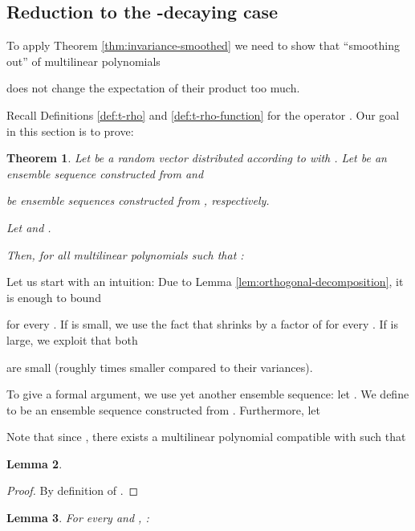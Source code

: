 \documentclass{daj}
\newcommand{\1}{\mathbbm{1}}
\theoremstyle{plain}
\newtheorem{theorem}{Theorem}[section]
\newtheorem{lemma}[theorem]{Lemma}
\theoremstyle{definition}
\begin{document}
\subsection{Reduction to the 
\texorpdfstring{}{gamma}-decaying case}

To apply Theorem \ref{thm:invariance-smoothed} we
need to show that ``smoothing out''  of multilinear polynomials 

does not change the expectation of their product too much.

Recall Definitions \ref{def:t-rho} and \ref{def:t-rho-function} 
for the operator . Our goal in this section is to prove:
\begin{theorem}
\label{thm:smoothing}
Let  be a random vector distributed according
to 
with .
Let  be an ensemble sequence constructed from
 and 

be ensemble sequences constructed from 
, respectively.

Let  and 
.

Then, for all multilinear polynomials  such that
:

\end{theorem}

Let us start with an intuition:
Due to Lemma \ref{lem:orthogonal-decomposition},
it is enough to bound

for every . If  is small, we use the fact that
 shrinks by a factor of 
for every .
If  is large, we exploit that both

are small (roughly  times smaller compared to their variances).

To give a formal argument, we use yet another ensemble sequence:
let . We define   to be an
ensemble sequence constructed from .
Furthermore, let

Note that since ,
there exists a multilinear polynomial  compatible with
 such that


\begin{lemma}
\label{lem:smooth-step-decomposition}

\end{lemma}

\begin{proof}
By definition of .
\end{proof}

\begin{lemma}
\label{lem:decomposition-rho-bound}
For every  and , :

\end{lemma}
\end{document}
